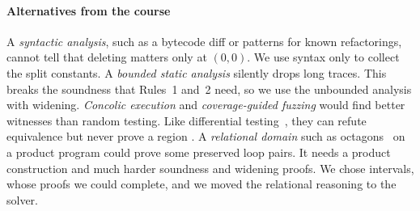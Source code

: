 \paragraph{Alternatives from the course}
A \emph{syntactic analysis}, such as a bytecode diff or patterns for known refactorings,
cannot tell that deleting  matters only at $(0,0)$. We use syntax
only to collect the split constants. A \emph{bounded static analysis} silently drops long
traces. This breaks the soundness that Rules~1 and~2 need, so we use the unbounded analysis
with widening. \emph{Concolic execution} and \emph{coverage-guided fuzzing} would find better
witnesses than random testing. Like differential testing~\citep{mckeeman1998differential},
they can refute equivalence but never prove a region \pres{}. A \emph{relational domain} such
as octagons~\citep{mine2006octagon} on a product program could prove some preserved loop
pairs. It needs a product construction and much harder soundness and widening proofs. We chose
intervals, whose proofs we could complete, and we moved the relational reasoning to the
solver.

